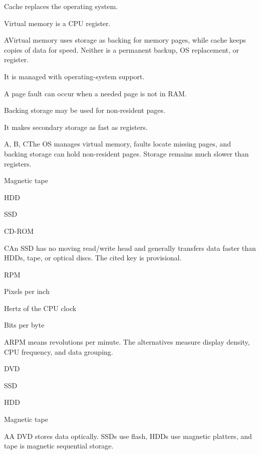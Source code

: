 \begin{enumerate}[label=\textbf{Q\arabic*.}, leftmargin=*]
{   \item Cache replaces the operating system.
   \item Virtual memory is a CPU register.}
  {A}{Virtual memory uses storage as backing for memory pages, while cache keeps copies of data for speed. Neither is a permanent backup, OS replacement, or register.}
  {\item It is managed with operating-system support.
   \item A page fault can occur when a needed page is not in RAM.
   \item Backing storage may be used for non-resident pages.
   \item It makes secondary storage as fast as registers.}
  {A, B, C}{The OS manages virtual memory, faults locate missing pages, and backing storage can hold non-resident pages. Storage remains much slower than registers.}
\fi
\ifnum{}
  {\item Magnetic tape
   \item HDD
   \item SSD
   \item CD-ROM}
  {C}{An SSD has no moving read/write head and generally transfers data faster than HDDs, tape, or optical discs. The cited key is provisional.}
  {\item RPM
   \item Pixels per inch
   \item Hertz of the CPU clock
   \item Bits per byte}
  {A}{RPM means revolutions per minute. The alternatives measure display density, CPU frequency, and data grouping.}
  {\item DVD
   \item SSD
   \item HDD
   \item Magnetic tape}
  {A}{A DVD stores data optically. SSDs use flash, HDDs use magnetic platters, and tape is magnetic sequential storage.}

\end{enumerate}
